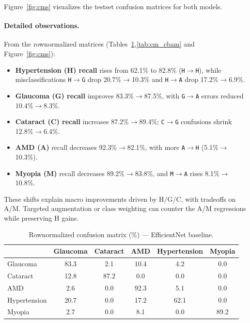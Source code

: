 Figure~\ref{fig:cms} visualizes the test\textendash set confusion matrices for both models.

\paragraph{Detailed observations.}
From the row\textendash normalized matrices (Tables~\ref{tab:cm_baseline},\ref{tab:cm_cbam} and Figure~\ref{fig:cms}):
\begin{itemize}
  \item \textbf{Hypertension (H) recall} rises from 62.1\% to 82.8\% (\texttt{H$\to$H}), while misclassifications \texttt{H$\to$G} drop 20.7\%$\to$10.3\% and \texttt{H$\to$A} drop 17.2\%$\to$6.9\%.
  \item \textbf{Glaucoma (G) recall} improves 83.3\%$\to$87.5\%, with \texttt{G$\to$A} errors reduced 10.4\%$\to$8.3\%.
  \item \textbf{Cataract (C) recall} increases 87.2\%$\to$89.4\%; \texttt{C$\to$G} confusions shrink 12.8\%$\to$6.4\%.
  \item \textbf{AMD (A)} recall decreases 92.3\%$\to$82.1\%, with more \texttt{A$\to$H} (5.1\%$\to$10.3\%).
  \item \textbf{Myopia (M)} recall decreases 89.2\%$\to$83.8\%, and \texttt{M$\to$A} rises 8.1\%$\to$10.8\%.
\end{itemize}
These shifts explain macro improvements driven by H/G/C, with trade\textendash offs on A/M. Targeted augmentation or class weighting can counter the A/M regressions while preserving H gains.

\begin{table}[t]
  \centering
  \caption{Row\textendash normalized confusion matrix (\%) — EfficientNet baseline.}
  \label{tab:cm_baseline}
  \begin{tabular}{lccccc}
    \toprule
     & Glaucoma & Cataract & AMD & Hypertension & Myopia \\
    \midrule
    Glaucoma & 83.3 & 2.1 & 10.4 & 4.2 & 0.0 \\
    Cataract & 12.8 & 87.2 & 0.0 & 0.0 & 0.0 \\
    AMD & 2.6 & 0.0 & 92.3 & 5.1 & 0.0 \\
    Hypertension & 20.7 & 0.0 & 17.2 & 62.1 & 0.0 \\
    Myopia & 2.7 & 0.0 & 8.1 & 0.0 & 89.2 \\
    \bottomrule
  \end{tabular}
\end{table}

